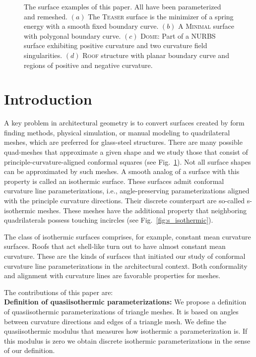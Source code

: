 \documentclass[Thesis.tex]{subfiles}
\begin{document}
\begin{figure}
\centering
\resizebox{\linewidth}{!}{}
\caption[Quasiisothermic parameterization: Examples]{The surface examples of this paper. All have been parameterized and
remeshed. $(a)$ The \textsc{Teaser} surface is the minimizer of a spring energy
with a smooth fixed boundary curve. $(b)$ A \textsc{Minimal} surface with
polygonal boundary curve. $(c)$ \textsc{Dome}: Part of a NURBS surface
exhibiting positive curvature and two curvature field singularities. $(d)$
\textsc{Roof} structure with planar boundary curve and regions of positive and
negative curvature.} 
\label{fig:all_mesh}
\end{figure}

\section{Introduction}
A key problem in architectural geometry is to convert surfaces created by form
finding methods, physical simulation, or manual modeling to quadrilateral
meshes, which are preferred for glass-steel structures. There are many 
possible quad-meshes that approximate a given shape and we study those that consist
of principle-curvature-aligned conformal squares (see Fig.~\ref{fig:all_mesh}). 
Not all surface shapes can be approximated by such meshes. A smooth analog of
a surface with this property is called an isothermic surface. These surfaces admit conformal
curvature line parameterizations, i.e., angle-preserving parameterizations
aligned with the principle curvature directions. Their discrete counterpart are 
so-called s-isothermic meshes. These meshes have the additional property that
neighboring quadrilaterals possess touching incircles (see
Fig.~\ref{fig:s_isothermic}).  

The class of isothermic surfaces comprises, for example, constant mean
curvature surfaces. Roofs that act shell-like turn out to have almost constant
mean curvature. These are the kinds of surfaces that initiated our study of
conformal curvature line parameterizations in the architectural context. Both
conformality and alignment with curvature lines are favorable
properties for meshes. 

\noindent The contributions of this paper are:\\
\noindent\textbf{Definition of quasiisothermic parameterizations:} 
We propose a definition of quasiisothermic parameterizations of triangle meshes. 
It is based on angles between curvature directions and edges of a triangle mesh.
We define the quasiisothermic modulus that measures how isothermic a 
parameterization is. If this modulus is zero we obtain discrete isothermic 
parameterizations in the sense of our definition.
\end{document}
